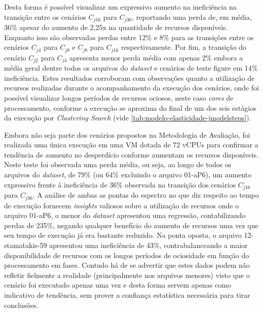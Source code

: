 \documentclass[english,brazilian]{UNISINOSmonografia} %
\begin{document}
Desta forma é possível visualizar um expressivo aumento na ineficiência na transição entre os cenários $C_{j16}$ para $C_{j36}$, reportando uma perda de, em média, 36\% apesar do aumento de 2,25x na quantidade de recursos disponíveis.
%
Enquanto isso são observadas perdas entre 12\% e 8\% para as transições entre os cenários $C_{j4}$ para $C_{j8}$ e $C_{j8}$ para $C_{j16}$ respectivamente.
%
Por fim, a transição do cenário $C_{j2}$ para $C_{j4}$ apresenta menor perda média com apenas 2\% embora a média geral dentre todos os arquivos do \textit{dataset} e cenários de teste figure em 14\% ineficiência.
%
Estes resultados corroboram com observações quanto a utilização de recursos realizadas durante o acompanhamento da execução dos cenários, onde foi possível visualizar longos períodos de recursos ociosos, neste caso \textit{cores} de processamento, conforme a execução se aproxima do final de um dos seis estágios da execução por \textit{Clustering Search} (vide \autoref{tab:modelo-elasticidade-jmodelsteps}).



Embora não seja parte dos cenários propostos na Metodologia de Avaliação, foi realizada uma única execução em uma VM dotada de 72 vCPUs para confirmar a tendência de aumento no desperdício conforme aumentam os recursos disponíveis.
%
Neste teste foi observada uma perda média, ou seja, ao longo de todos os arquivos do \textit{dataset}, de 79\% (ou 64\% excluindo o arquivo 01-aP6), um aumento expressivo frente à ineficiência de 36\% observada na transição dos cenários $C_{j16}$ para $C_{j36}$.
%
A análise de ambas as pontas do espectro no que diz respeito ao tempo de execução fornecem \textit{insights} valiosos sobre a utilização de recursos onde o arquivo 01-aP6, o menor do \textit{dataset} apresentou uma regressão, contabilizando perdas de 235\%, negando qualquer benefício do aumento de recursos uma vez que seu tempo de execução já era bastante reduzido.
%
Na ponta oposta, o arquivo 12-stamatakis-59 apresentou uma ineficiência de 43\%, contrabalanceando a maior disponibilidade de recursos com os longos períodos de ociosidade em função do processamento em fases.
%
Contudo há de se advertir que estes dados podem não refletir fielmente a realidade (principalmente nos arquivos menores) visto que o cenário foi executado apenas uma vez e desta forma servem apenas como indicativo de tendência, sem prover a confiança estatística necessária para tirar conclusões.
\end{document}
